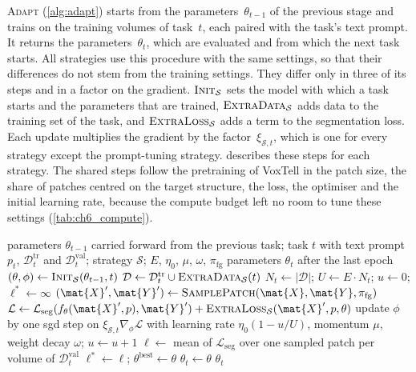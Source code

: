 \textsc{Adapt} (\cref{alg:adapt}) starts from the parameters~$\theta_{t-1}$ of the previous stage and trains on the training volumes of task~$t$, each paired with the task's text prompt.
It returns the parameters~$\theta_t$, which are evaluated and from which the next task starts.
All strategies use this procedure with the same settings, so that their differences do not stem from the training settings.
They differ only in three of its steps and in a factor on the gradient.
$\textsc{Init}_{\mathcal{S}}$ sets the model with which a task starts and the parameters that are trained, $\textsc{ExtraData}_{\mathcal{S}}$ adds data to the training set of the task, and $\textsc{ExtraLoss}_{\mathcal{S}}$ adds a term to the segmentation loss.
Each update multiplies the gradient by the factor~$\xi_{\mathcal{S},t}$, which is one for every strategy except the prompt-tuning strategy.
 describes these steps for each strategy.
The shared steps follow the pretraining of VoxTell in the patch size, the share of patches centred on the target structure, the loss, the optimiser and the initial learning rate, because the compute budget left no room to tune these settings (\cref{tab:ch6_compute}).

\begin{algorithm}[tb]
\caption{\textsc{Adapt}: adapting VoxTell to task~$t$. The steps with subscript~$\mathcal{S}$ are where the strategies differ (\cref{sec:method-strategies}).}
\label{alg:adapt}
\begin{algorithmic}[1]
\REQUIRE parameters $\theta_{t-1}$ carried forward from the previous task; task $t$ with text prompt $p_t$, $\mathcal{D}_t^{\mathrm{tr}}$ and $\mathcal{D}_t^{\mathrm{val}}$; strategy $\mathcal{S}$; $E$, $\eta_0$, $\mu$, $\omega$, $\pi_{\mathrm{fg}}$
\ENSURE parameters $\theta_t$ after the last epoch
\STATE $(\theta, \phi) \gets \textsc{Init}_{\mathcal{S}}(\theta_{t-1}, t)$ 
\STATE $\mathcal{D} \gets \mathcal{D}_t^{\mathrm{tr}} \cup \textsc{ExtraData}_{\mathcal{S}}(t)$
\STATE $N_t \gets |\mathcal{D}|$; \quad $U \gets E \cdot N_t$; \quad $u \gets 0$; \quad $\ell^{*} \gets \infty$
    \STATE $(\mat{X}', \mat{Y}') \gets \textsc{SamplePatch}(\mat{X}, \mat{Y}, \pi_{\mathrm{fg}})$
    \STATE $\mathcal{L} \gets \mathcal{L}_{\mathrm{seg}}(f_\theta(\mat{X}', p), \mat{Y}') + \textsc{ExtraLoss}_{\mathcal{S}}(\mat{X}', p, \theta)$
    \STATE update $\phi$ by one \gls{sgd} step on $\xi_{\mathcal{S},t} \nabla_\phi \mathcal{L}$ with learning rate $\eta_0 (1 - u/U)$, momentum $\mu$, weight decay $\omega$; \quad $u \gets u + 1$
  \ENDFOR
  \STATE $\ell \gets$ mean of $\mathcal{L}_{\mathrm{seg}}$ over one sampled patch per volume of $\mathcal{D}_t^{\mathrm{val}}$
  \IF{$\ell < \ell^{*}$}
    \STATE $\ell^{*} \gets \ell$; \quad $\theta^{\mathrm{best}} \gets \theta$
  \ENDIF
\ENDFOR
\STATE $\theta_t \gets \theta$ 
\RETURN $\theta_t$
\end{algorithmic}
\end{algorithm}

